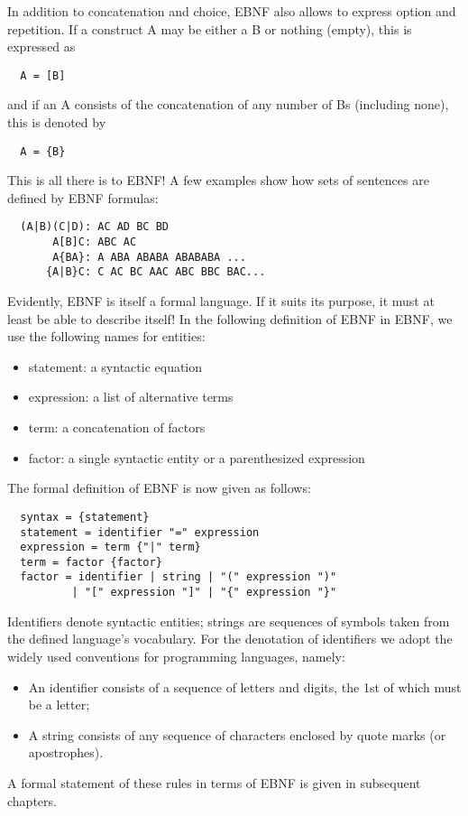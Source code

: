In addition to concatenation and choice, EBNF also allows to express option and repetition. If a
construct A may be either a B or nothing (empty), this is expressed as
\begin{verbatim}
  A = [B]
\end{verbatim}
and if an A consists of the concatenation of any number of Bs (including none), this is denoted by
\begin{verbatim}
  A = {B}
\end{verbatim}
This is all there is to EBNF! A few examples show how sets of sentences are defined by EBNF formulas:
\begin{verbatim}
  (A|B)(C|D): AC AD BC BD
       A[B]C: ABC AC
       A{BA}: A ABA ABABA ABABABA ...
      {A|B}C: C AC BC AAC ABC BBC BAC...
\end{verbatim}
Evidently, EBNF is itself a formal language. If it suits its purpose, it must at least be able to describe
itself! In the following definition of EBNF in EBNF, we use the following names for entities:
\begin{itemize}
  \item statement: a syntactic equation
  \item expression: a list of alternative terms
  \item term: a concatenation of factors
  \item factor: a single syntactic entity or a parenthesized expression
\end{itemize}

The formal definition of EBNF is now given as follows:
\begin{verbatim}
  syntax = {statement}
  statement = identifier "=" expression
  expression = term {"|" term}
  term = factor {factor}
  factor = identifier | string | "(" expression ")"
          | "[" expression "]" | "{" expression "}"
\end{verbatim}
Identifiers denote syntactic entities; strings are sequences of symbols taken from the defined
language's vocabulary. For the denotation of identifiers we adopt the widely used conventions
for programming languages, namely:
\begin{itemize}
  \item An identifier consists of a sequence of letters and digits, the 1st of which must be a letter;
  \item A string consists of any sequence of characters enclosed by quote marks (or apostrophes).
\end{itemize}
A formal statement of these rules in terms of EBNF is given in subsequent chapters.
